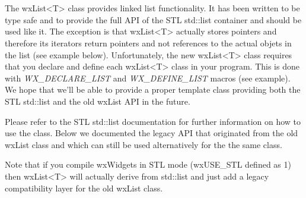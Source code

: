 
\section{}\label{wxlist}

The wxList<T> class provides linked list functionality. It has been written
to be type safe and to provide the full API of the STL std::list container and
should be used like it. The exception is that wxList<T> actually stores
pointers and therefore its iterators return pointers and not references
to the actual objets in the list (see example below). Unfortunately, the
new wxList<T> class requires that you declare and define each wxList<T>
class in your program. This is done with {\it WX\_DECLARE\_LIST} and 
{\it WX\_DEFINE\_LIST} macros (see example). We hope that we'll be able
to provide a proper template class providing both the STL std::list
and the old wxList API in the future.

Please refer to the STL std::list documentation for further
information on how to use the class. Below we documented the legacy
API that originated from the old wxList class and which can still 
be used alternatively for the the same class.

Note that if you compile wxWidgets in STL mode (wxUSE\_STL defined as 1) 
then wxList<T> will actually derive from std::list and just add a legacy 
compatibility layer for the old wxList class.



